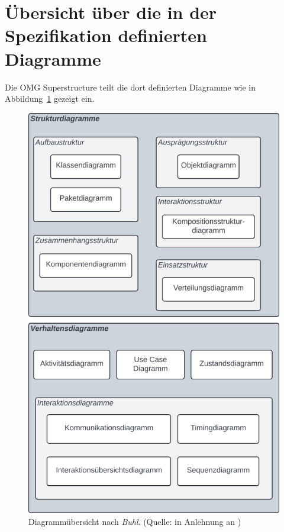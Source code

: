 \section{Übersicht über die in der Spezifikation definierten Diagramme}

Die OMG Superstructure teilt die dort definierten Diagramme wie in Abbildung~\ref{fig:diagrammuebersicht} gezeigt ein.

\begin{figure}
    \centering
    \includegraphics[scale=0.5]{part three/Einführung/img/diagrammübersicht}
    \caption{Diagrammübersicht nach \textit{Buhl}. (Quelle: in Anlehnung an \cite[7]{Buh09})}
    \label{fig:diagrammuebersicht}
\end{figure}

